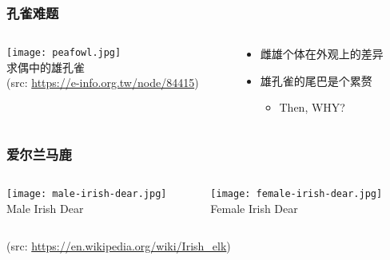\documentclass[UTF8,lualatex]{ctexbeamer}
\begin{document}
\begin{frame}
    \frametitle{孔雀难题}
    \begin{columns}
        \begin{column}{.47\textwidth}
            \texttt{[image: peafowl.jpg]}
            \\
            求偶中的雄孔雀
            \\ \small
            (src: \url{https://e-info.org.tw/node/84415})
        \end{column}
        \begin{column}{.47\textwidth}
            \begin{itemize}
                \item 雌雄个体在外观上的差异
                \item 雄孔雀的尾巴是个累赘
                    \begin{itemize}
                        \item<2> Then, WHY?
                    \end{itemize}
            \end{itemize}
        \end{column}
    \end{columns}
\end{frame}


\begin{frame}
    \frametitle{爱尔兰马鹿}
    \begin{columns}
        \begin{column}{0.48\textwidth}
            \texttt{[image: male-irish-dear.jpg]}
            \\ \small
            Male Irish Dear
        \end{column}
        \begin{column}{0.48\textwidth}
            \texttt{[image: female-irish-dear.jpg]}
            \\ \small
            Female Irish Dear
        \end{column}
    \end{columns}
    
    \begin{center}
        \small
        (src: \url{https://en.wikipedia.org/wiki/Irish_elk})    
    \end{center}
\end{frame}
\end{document}
